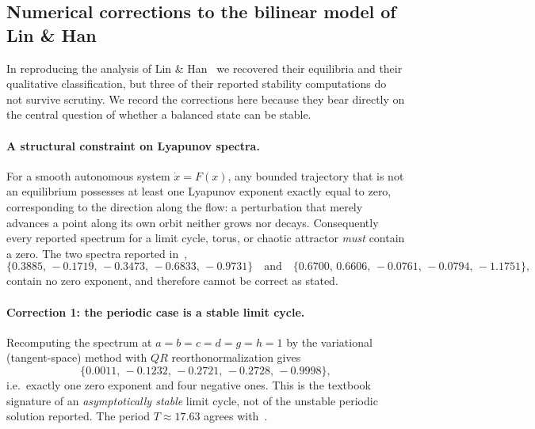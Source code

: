 \documentclass{article}
\begin{document}

\subsection{Numerical corrections to the bilinear model of Lin \& Han}
\label{sec:corrections}

In reproducing the analysis of Lin \& Han~\cite{Lin2020} we recovered their
equilibria and their qualitative classification, but three of their reported
stability computations do not survive scrutiny. We record the corrections here
because they bear directly on the central question of whether a balanced state
can be stable.

\paragraph{A structural constraint on Lyapunov spectra.}
For a smooth autonomous system $\dot{x}=F(x)$, any bounded trajectory that is not
an equilibrium possesses at least one Lyapunov exponent exactly equal to zero,
corresponding to the direction along the flow: a perturbation that merely advances
a point along its own orbit neither grows nor decays. Consequently every reported
spectrum for a limit cycle, torus, or chaotic attractor \emph{must} contain a zero.
The two spectra reported in~\cite{Lin2020},
\[
\{0.3885,\,-0.1719,\,-0.3473,\,-0.6833,\,-0.9731\}
\quad\text{and}\quad
\{0.6700,\,0.6606,\,-0.0761,\,-0.0794,\,-1.1751\},
\]
contain no zero exponent, and therefore cannot be correct as stated.

\paragraph{Correction 1: the periodic case is a stable limit cycle.}
Recomputing the spectrum at $a=b=c=d=g=h=1$ by the variational (tangent-space)
method with $QR$ reorthonormalization gives
\[
\{0.0011,\,-0.1232,\,-0.2721,\,-0.2728,\,-0.9998\},
\]
i.e.\ exactly one zero exponent and four negative ones. This is the textbook
signature of an \emph{asymptotically stable} limit cycle, not of the unstable
periodic solution reported. The period $T\approx17.63$ agrees with~\cite{Lin2020}.
\end{document}
